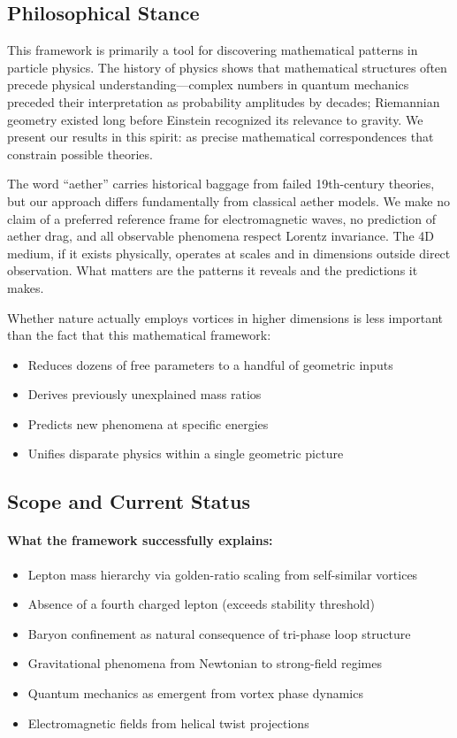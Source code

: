 \subsection{Philosophical Stance}

This framework is primarily a tool for discovering mathematical patterns in particle physics. The history of physics shows that mathematical structures often precede physical understanding---complex numbers in quantum mechanics preceded their interpretation as probability amplitudes by decades; Riemannian geometry existed long before Einstein recognized its relevance to gravity. We present our results in this spirit: as precise mathematical correspondences that constrain possible theories.

The word ``aether'' carries historical baggage from failed 19th-century theories, but our approach differs fundamentally from classical aether models. We make no claim of a preferred reference frame for electromagnetic waves, no prediction of aether drag, and all observable phenomena respect Lorentz invariance. The 4D medium, if it exists physically, operates at scales and in dimensions outside direct observation. What matters are the patterns it reveals and the predictions it makes.

Whether nature actually employs vortices in higher dimensions is less important than the fact that this mathematical framework:
\begin{itemize}
\item Reduces dozens of free parameters to a handful of geometric inputs
\item Derives previously unexplained mass ratios
\item Predicts new phenomena at specific energies
\item Unifies disparate physics within a single geometric picture
\end{itemize}

\subsection{Scope and Current Status}

\paragraph{What the framework successfully explains:}
\begin{itemize}
\item Lepton mass hierarchy via golden-ratio scaling from self-similar vortices
\item Absence of a fourth charged lepton (exceeds stability threshold)
\item Baryon confinement as natural consequence of tri-phase loop structure
\item Gravitational phenomena from Newtonian to strong-field regimes
\item Quantum mechanics as emergent from vortex phase dynamics
\item Electromagnetic fields from helical twist projections
\end{itemize}

